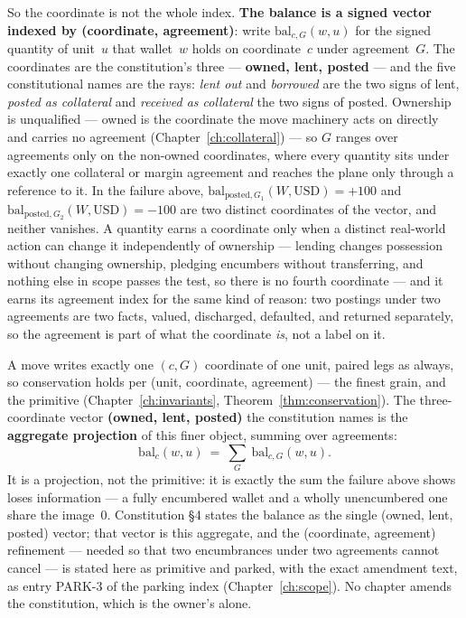 So the coordinate is not the whole index. \textbf{The balance is a signed vector indexed
by (coordinate, agreement)}: write $\mathrm{bal}_{c,G}(w,u)$ for the signed quantity of
unit~$u$ that wallet~$w$ holds on coordinate~$c$ under agreement~$G$. The coordinates are
the constitution's three --- \textbf{owned, lent, posted} --- and the five constitutional
names are the rays: \emph{lent out} and \emph{borrowed} are the two signs of lent,
\emph{posted as collateral} and \emph{received as collateral} the two signs of posted.
Ownership is unqualified --- owned is the coordinate the move machinery acts on directly
and carries no agreement (Chapter~\ref{ch:collateral}) --- so $G$ ranges over agreements
only on the non-owned coordinates, where every quantity sits under exactly one collateral
or margin agreement and reaches the plane only through a reference to it. In the failure
above, $\mathrm{bal}_{\text{posted},G_1}(W,\text{USD})=+100$ and
$\mathrm{bal}_{\text{posted},G_2}(W,\text{USD})=-100$ are two distinct coordinates of the
vector, and neither vanishes. A quantity earns a coordinate only when a distinct
real-world action can change it independently of ownership --- lending changes possession
without changing ownership, pledging encumbers without transferring, and nothing else in
scope passes the test, so there is no fourth coordinate --- and it earns its agreement
index for the same kind of reason: two postings under two agreements are two facts,
valued, discharged, defaulted, and returned separately, so the agreement is part of what
the coordinate \emph{is}, not a label on it.

A move writes exactly one $(c,G)$ coordinate of one unit, paired legs as always, so
conservation holds per (unit, coordinate, agreement) --- the finest grain, and the
primitive (Chapter~\ref{ch:invariants}, Theorem~\ref{thm:conservation}). The
three-coordinate vector \textbf{(owned, lent, posted)} the constitution names is the
\textbf{aggregate projection} of this finer object, summing over agreements:
\[
\mathrm{bal}_c(w,u)\ =\ \sum_{G}\ \mathrm{bal}_{c,G}(w,u).
\]
It is a projection, not the primitive: it is exactly the sum the failure above shows loses
information --- a fully encumbered wallet and a wholly unencumbered one share the
image~$0$. Constitution \S4 states the balance as the single (owned, lent, posted) vector;
that vector is this aggregate, and the (coordinate, agreement) refinement --- needed so
that two encumbrances under two agreements cannot cancel --- is stated here as primitive
and parked, with the exact amendment text, as entry PARK-3 of the parking index
(Chapter~\ref{ch:scope}). No chapter amends the constitution, which is the owner's alone.

